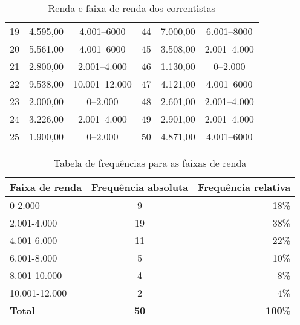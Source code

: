 \begin{resolucao}
\begin{table}[H]
\begin{tabular}{cccccc}
        19  & 4.595,00    & 4.001--6000    & 44 & 7.000,00  & 6.001--8000    \\
        20  & 5.561,00    & 4.001--6000    & 45 & 3.508,00  & 2.001--4.000   \\
        21  & 2.800,00    & 2.001--4.000   & 46 & 1.130,00  & 0--2.000       \\
        22  & 9.538,00    & 10.001--12.000 & 47 & 4.121,00  & 4.001--6000    \\
        23  & 2.000,00    & 0--2.000       & 48 & 2.601,00  & 2.001--4.000   \\
        24  & 3.226,00    & 2.001--4.000   & 49 & 2.901,00  & 2.001--4.000   \\
        25  & 1.900,00    & 0--2.000       & 50 & 4.871,00  & 4.001--6000    \\
        \bottomrule
    \end{tabular}
    \caption{Renda e faixa de renda dos correntistas}
    \label{tab:ex_01a}
\end{table}
\begin{table}[H]
    \centering
    \begin{tabular}{lcr}
        \toprule
        Faixa de renda & Frequência absoluta & Frequência relativa \\
        \midrule
        0-2.000        & 9                   & 18\% \\
        2.001-4.000    & 19                  & 38\% \\
        4.001-6.000    & 11                  & 22\% \\
        6.001-8.000    & 5                   & 10\% \\
        8.001-10.000   & 4                   & 8\% \\
        10.001-12.000  & 2                   & 4\% \\
        \midrule
        \textbf{Total} & \textbf{50}         & \textbf{100}\% \\
        \bottomrule
    \end{tabular}
    \caption{Tabela de frequências para as faixas de renda}
    \label{tab:ex_01b}
\end{table}
\end{resolucao}

